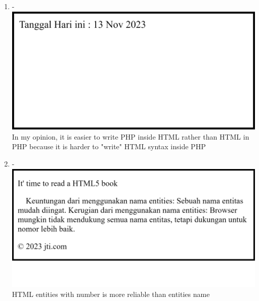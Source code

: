 \documentclass[12pt,titlepage]{article}
\begin{document}
\begin{enumerate}
    \item - \\ \includegraphics[width=.9\textwidth]{images/figures/fig17.png} \\ In my opinion, it is easier to write PHP inside HTML rather than HTML in PHP because it is harder to "write" HTML syntax inside PHP
    \item - \\ \includegraphics[width=.9\textwidth]{images/figures/fig18.png} \\ HTML entities with number is more reliable than entities name
    
    \newpage
    
\end{enumerate}
\end{document}
